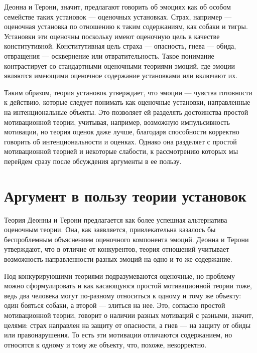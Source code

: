 \documentclass[11pt]{book}
\begin{document}
Деонна и Терони, значит, предлагают говорить об эмоциях как об особом семействе таких установок --- оценочных установках. Страх, например --- оценочная установка по отношению к таким содержаниям, как собаки и тигры. Установки эти оценочны поскольку имеют оценочную цель в качестве конститутивной. Конститутивная цель страха --- опасность, гнева --- обида, отвращения --- осквернение или отвратительность. Такое понимание контрастирует со стандартными оценочными теориями эмоций, где эмоции являются имеющими оценочное содержание установками или включают их.

Таким образом, теория установок утверждает, что эмоции --- чувства готовности к действию, которые следует понимать как оценочные установки, направленные на интенциональные объекты. Это позволяет ей разделять достоинства простой мотивационной теории, учитывая, например, возможную импульсивность мотивации, но теория оценок даже лучше, благодаря способности корректно говорить об интенциональности и оценках. Однако она разделяет с простой мотивационной теорией и некоторые слабости, к рассмотрению которых мы перейдем сразу после обсуждения аргументы в ее пользу.

\section{Аргумент в пользу теории установок}

Теория Деонны и Терони предлагается как более успешная альтернатива оценочным теории. Она, как заявляется, привлекательна казалось бы беспроблемным объяснением оценочного компонента эмоций. Деонна и Терони утверждают, что в отличие от конкурентов, теория отношений учитывает возможность направленности разных эмоций на одно и то же содержание.

Под конкурирующими теориями подразумеваются оценочные, но проблему можно сформулировать и как касающуюся простой мотивационной теории тоже, ведь два человека могут по-разному относиться к одному и тому же объекту: один бояться собаки, а второй --- злиться на нее. Это, согласно простой мотивационной теории, говорит о наличии разных мотиваций с разными, значит, целями: страх направлен на защиту от опасности, а гнев --- на защиту от обиды или правонарушения. То есть эти мотивации отличаются содержанием, но относятся к одному и тому же объекту, что, похоже, некорректно.
\end{document}

